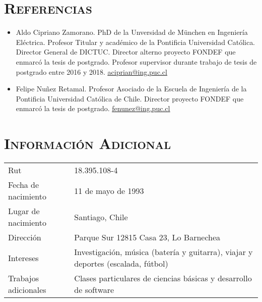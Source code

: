 \documentclass[a4paper,10pt]{article}
\begin{document}
\bigskip
\section*{\textsc{Referencias}}

\begin{itemize}
	\item Aldo Cipriano Zamorano. PhD de la Unversidad de München en Ingeniería Eléctrica. Profesor Titular y académico de la Pontificia Universidad Católica. Director General de DICTUC. Director alterno proyecto FONDEF que enmarcó la tesis de postgrado. Profesor supervisor durante trabajo de tesis de postgrado entre 2016 y 2018. \href{mailto:aciprian@ing.puc.cl}{\underline{aciprian@ing.puc.cl}}
	\item Felipe Nuñez Retamal. Profesor Asociado de la Escuela de Ingeniería de la Pontificia Universidad Católica de Chile. Director proyecto FONDEF que enmarcó la tesis de postgrado. \href{mailto:fenunez@ing.puc.cl}{\underline{fenunez@ing.puc.cl}}
\end{itemize}

\bigskip
\section*{\textsc{Información Adicional}}
\begin{tabular}{ll}
Rut 			& 18.395.108-4 \\
Fecha de nacimiento & 11 de mayo de 1993\\
Lugar de nacimiento & Santiago, Chile\\
Dirección & Parque Sur 12815 Casa 23, Lo Barnechea\\
Intereses & Investigación, música (batería y guitarra), viajar y deportes (escalada, fútbol)  \\
Trabajos adicionales & Clases particulares de ciencias básicas y desarrollo de software
\end{tabular}
\end{document}
